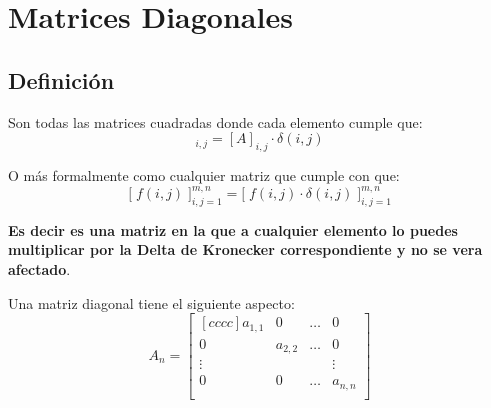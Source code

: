 \documentclass[12pt, fleqn]{report}                             %
\theoremstyle{break}                                            %
\newcommand{\BigBrackets}[1]    {\Big[ \; #1 \; \Big]}          %
\begin{document}
        \clearpage
        \section{Matrices Diagonales}

            \subsection{Definición}

                Son todas las matrices cuadradas donde cada elemento cumple que:
                \begin{equation*}
                    [A]_{i,j} = [A]_{i,j} \cdot \delta(i,j)
                \end{equation*}

                O más formalmente como cualquier matriz que cumple con que:
                \begin{equation*}
                    \BigBrackets{f(i,j)}_{i, j = 1}^{m, n} 
                        =
                    \BigBrackets{f(i,j) \cdot \delta(i,j) }_{i, j = 1}^{m, n}  
                \end{equation*}

                \textbf{Es decir es una matriz en la que a cualquier elemento lo puedes multiplicar 
                por la Delta de Kronecker correspondiente y no se vera afectado}.

                Una matriz diagonal tiene el siguiente aspecto:
                \begin{equation*}
                    A_n =
                    \begin{bmatrix}[cccc]
                        a_{1,1} & 0         & \dots & 0         \\
                        0       & a_{2,2}   & \dots & 0         \\
                        \vdots  &           &       & \vdots    \\
                        0       & 0         & \dots & a_{n,n}   \\
                    \end{bmatrix}
                \end{equation*}
\end{document}
